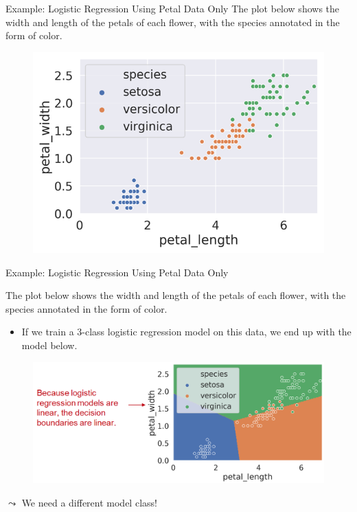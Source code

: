 \documentclass[aspectratio=169]{../latex_main/tntbeamer}  %
\begin{document}
 	\begin{frame}{Example: Logistic Regression Using Petal Data Only}
	    The plot below shows the width and length of the petals of each flower, with the species annotated in the form of color.
	    \begin{figure}
	        \centering
	        \includegraphics[scale=.75]{figure_tree/Bild3}
	    \end{figure}
	\end{frame}
	
	\begin{frame}{Example: Logistic Regression Using Petal Data Only}

        \vspace{-1em}
	    The plot below shows the width and length of the petals of each flower, with the species annotated in the form of color.
	    \begin{itemize}
	        \item If we train a 3-class logistic regression model on this data, we end up with the model below.
	    \end{itemize}
	    \begin{figure}
	        \centering
	        \includegraphics[scale=.4]{figure_tree/Bild4}
	    \end{figure}

        $\leadsto$ \alert{We need a different model class!}
     
	\end{frame}
 
\end{document}
